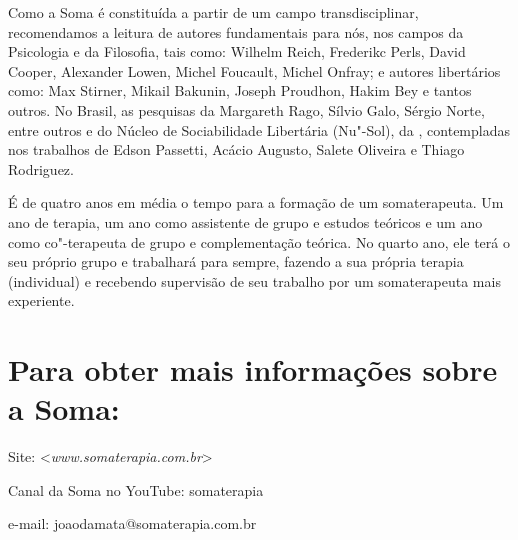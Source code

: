 Como a Soma é constituída a partir de um campo transdisciplinar,
recomendamos a leitura de autores fundamentais para nós, nos campos da
Psicologia e da Filosofia, tais como: Wilhelm Reich, Frederikc Perls,
David Cooper, Alexander Lowen, Michel Foucault, Michel Onfray; e autores
libertários como: Max Stirner, Mikail Bakunin, Joseph Proudhon, Hakim
Bey e tantos outros. No Brasil, as pesquisas da Margareth Rago, Sílvio
Galo, Sérgio Norte, entre outros e do Núcleo de Sociabilidade Libertária
(Nu"-Sol), da , contempladas nos trabalhos de Edson Passetti,
Acácio Augusto, Salete Oliveira e Thiago Rodriguez.

É de quatro anos em média o tempo para a formação de um somaterapeuta.
Um ano de terapia, um ano como assistente de grupo e estudos teóricos e
um ano como co"-terapeuta de grupo e complementação teórica. No quarto
ano, ele terá o seu próprio grupo e trabalhará para sempre, fazendo a
sua própria terapia (individual) e recebendo supervisão de seu trabalho
por um somaterapeuta mais experiente.

\section*{Para obter mais informações sobre a Soma:}

Site:
\textless{}\emph{www.somaterapia.com.br}\textgreater{}

Canal da Soma no YouTube: somaterapia

e-mail: joaodamata@somaterapia.com.br